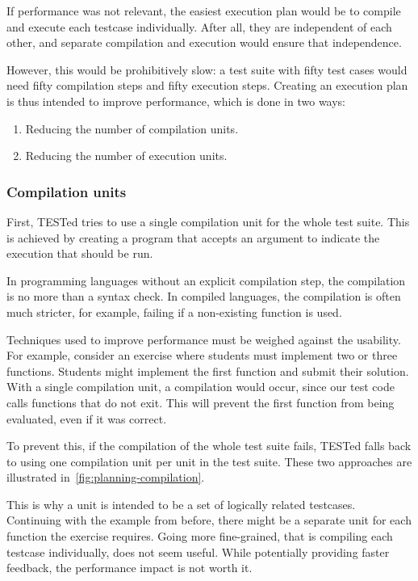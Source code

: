 \documentclass[../main]{subfiles}
\begin{document}
If performance was not relevant, the easiest execution plan would be to compile and execute each testcase individually.
After all, they are independent of each other, and separate compilation and execution would ensure that independence.

However, this would be prohibitively slow: a test suite with fifty test cases would need fifty compilation steps and fifty execution steps.
Creating an execution plan is thus intended to improve performance, which is done in two ways:

\begin{enumerate}[noitemsep]
    \item Reducing the number of compilation units.
    \item Reducing the number of execution units.
\end{enumerate}

\subsubsection{Compilation units}
\label{subsubsec:compilation-units}

First, TESTed tries to use a single compilation unit for the whole test suite.
This is achieved by creating a program that accepts an argument to indicate the execution that should be run.

In programming languages without an explicit compilation step, the compilation is no more than a syntax check.
In compiled languages, the compilation is often much stricter, for example, failing if a non-existing function is used.

Techniques used to improve performance must be weighed against the usability.
For example, consider an exercise where students must implement two or three functions.
Students might implement the first function and submit their solution.
With a single compilation unit, a compilation would occur, since our test code calls functions that do not exit.
This will prevent the first function from being evaluated, even if it was correct.

To prevent this, if the compilation of the whole test suite fails, TESTed falls back to using one compilation unit per unit in the test suite.
These two approaches are illustrated in~\cref{fig:planning-compilation}.

This is why a unit is intended to be a set of logically related testcases.
Continuing with the example from before, there might be a separate unit for each function the exercise requires.
Going more fine-grained, that is compiling each testcase individually, does not seem useful.
While potentially providing faster feedback, the performance impact is not worth it.
\end{document}
